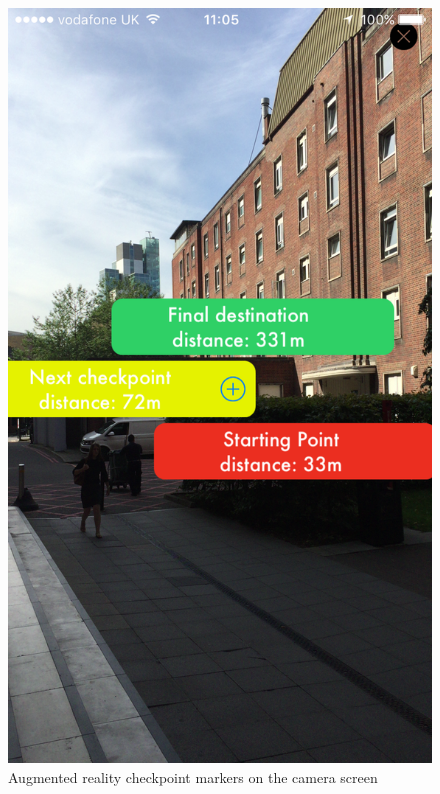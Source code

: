 \begin{figure}[!ht]
\centering
\includegraphics[scale=0.15]{img/ar.png}
\caption{Augmented reality checkpoint markers on the camera screen}
\label{fig:ar}
\end{figure}

